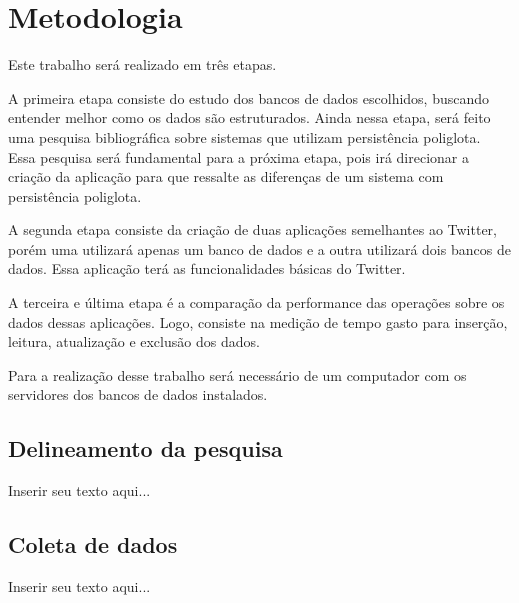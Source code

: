 %
%

\chapter{Metodologia}

Este trabalho será realizado em três etapas.

A primeira etapa consiste do estudo dos bancos de dados escolhidos, buscando entender melhor como os dados são estruturados. Ainda nessa etapa, será feito uma pesquisa bibliográfica sobre sistemas que utilizam persistência poliglota. Essa pesquisa será fundamental para a próxima etapa, pois irá direcionar a criação da aplicação para que ressalte as diferenças de um sistema com persistência poliglota.

A segunda etapa consiste da criação de duas aplicações semelhantes ao Twitter, porém uma utilizará apenas um banco de dados e a outra utilizará dois bancos de dados. Essa aplicação terá as funcionalidades básicas do Twitter.

A terceira e última etapa é a comparação da performance das operações sobre os dados dessas aplicações. Logo, consiste na medição de tempo gasto para inserção, leitura, atualização e exclusão dos dados.

Para a realização desse trabalho será necessário de um computador com os servidores dos bancos de dados instalados.


\section{Delineamento da pesquisa}

Inserir seu texto aqui...

\section{Coleta de dados}

Inserir seu texto aqui...

